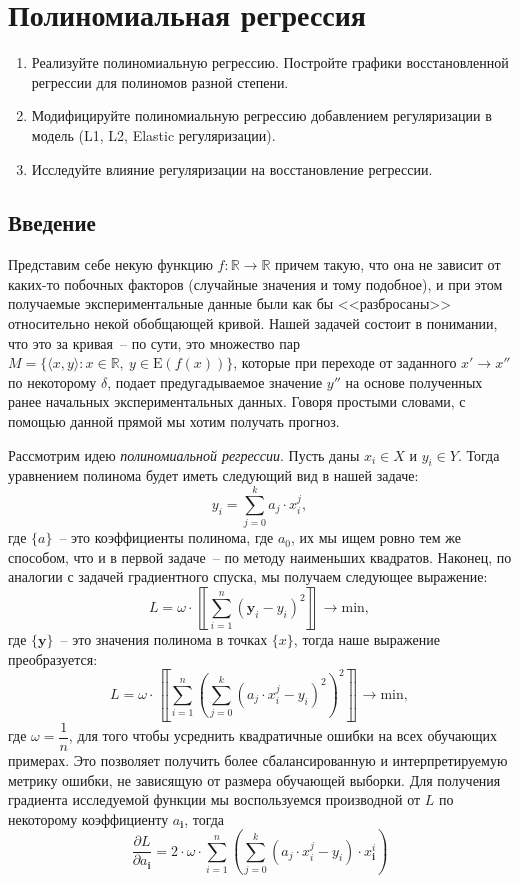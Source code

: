 \documentclass[12pt, a4paper, oneside, final]{article}
\begin{document}
	\section*{Полиномиальная регрессия}
	\begin{enumerate}[1.]
		\item
		Реализуйте полиномиальную регрессию.
		Постройте графики восстановленной регрессии для полиномов разной степени.
		\item
		Модифицируйте полиномиальную регрессию добавлением регуляризации в модель (L1, L2, Elastic регуляризации).
		\item
		Исследуйте влияние регуляризации на восстановление регрессии.
	\end{enumerate}
	\subsection*{Введение}
	Представим себе некую функцию $f : \mathbb{R} \to \mathbb{R}$ причем такую, что она не зависит от каких-то побочных факторов (случайные значения и тому подобное), и при этом получаемые экспериментальные данные были как бы <<разбросаны>> относительно некой обобщающей кривой.
	Нашей задачей состоит в понимании, что это за кривая~-- по сути, это множество пар $M = \{\langle x, y\rangle : x \in \mathbb{R}, ~ y \in \mathrm{E}{(f(x))}\}$, которые при переходе от заданного $x' \to x''$ по некоторому $\delta$, подает предугадываемое значение $y''$ на основе полученных ранее начальных экспериментальных данных.
	Говоря простыми словами, с помощью данной прямой мы хотим получать прогноз.

	Рассмотрим идею \textit{полиномиальной регрессии}.
	Пусть даны $x_{i} \in X$ и $y_{i} \in Y$.
	Тогда уравнением полинома будет иметь следующий вид в нашей задаче:
	\[
		y_{i} = \sum\limits_{j = 0}^{k}{a_{j} \cdot x_{i}^{j}},
	\]
	где $\{a\}$~-- это коэффициенты полинома, где $a_{0}$, их мы ищем ровно тем же способом, что и в первой задаче~-- по методу наименьших квадратов.
	Наконец, по аналогии с задачей градиентного спуска, мы получаем следующее выражение:
	\[
		L = \omega \cdot \left\llbracket\sum\limits_{i = 1}^{n}{\left(\mathbf{y}_{i} - y_{i}\right)^{2}}\right\rrbracket \to \mathrm{min},
	\]
	где $\{\mathbf{y}\}$~-- это значения полинома в точках $\{x\}$, тогда наше выражение преобразуется:
	\[
		L = \omega \cdot \left\llbracket\sum\limits_{i = 1}^{n}{\left(\sum\limits_{j = 0}^{k}{\left(a_{j} \cdot x_{i}^{j} - y_{i}\right)^{2}}\right)^{2}}\right\rrbracket \to \mathrm{min},
	\]
	где $\omega = \dfrac{1}{n}$, для того чтобы усреднить квадратичные ошибки на всех обучающих примерах.
	Это позволяет получить более сбалансированную и интерпретируемую метрику ошибки, не зависящую от размера обучающей выборки.
	Для получения градиента исследуемой функции мы воспользуемся производной от $L$ по некоторому коэффициенту $a_{\mathbf{i}}$, тогда
	\[
		\dfrac{\partial{L}}{\partial{a_{\mathbf{i}}}} = 2 \cdot \omega \cdot \sum\limits_{i = 1}^{n}{\left(\sum\limits_{j = 0}^{k}{\left(a_{j} \cdot x_{i}^{j} - y_{i}\right) \cdot x^{i}_{\mathbf{i}}}\right)}
	\]
\end{document}
